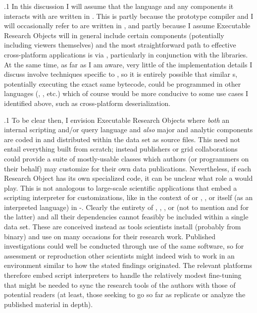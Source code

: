 \documentclass[11pt, twocolumn]{article}
\begin{document}
\p.1{%
In this discussion I will assume that the language and
any components it interacts with are written in .
This is partly because the prototype compiler and
 I will occasionally refer to are written in ,
and partly because I assume Executable Research Objects
will in general include certain  components
(potentially including  viewers themselves) and the
most straightforward path to effective cross-platform
 applications is via , particularly in conjunction
with the  libraries. At the same time, as far as I am
aware, very little of the implementation details
I discuss involve techniques specific to , so it
is entirely possible that similar s, potentially
executing the exact same bytecode, could be programmed
in other languages (, , etc.) \mdash{}
which of course would be more conducive to some use cases
I identified above, such as cross-platform deserialization.
}%

\p.1{%
To be clear then, I envision Executable Research Objects
where \textit{both} an internal scripting and/or query language
and \textit{also} major  and analytic components
are coded in  and distributed within the data set
as source files. This need not entail everything
built from scratch; instead publishers or grid collaborations
could provide a suite of mostly-usable classes which
authors (or programmers on their behalf) may customize
for their own data publications. Nevertheless, if
each Research Object has its own specialized
 code, it can be unclear what role a  would play.
This is not analogous to large-scale scientific
applications that embed a scripting interpreter
for customizations, like  in the context of
 or ,  \visavis{} ,
or  itself (as an interpreted language) in -.
Clearly the entirety of , , ,
or  (not to mention  and  for the latter)
and all their dependencies cannot feasibly be included
within a single data set. These are conceived instead
as tools scientists install (probably from binary)
and use on many occasions for their research work.
Published investigations could well be conducted
through use of the same software, so for assessment
or reproduction other scientists might indeed wish
to work in an environment similar to how the
stated findings originated. The relevant platforms
therefore embed script interpreters to handle
the relatively modest fine-tuning that might be
needed to sync the research tools of the
authors with those of potential readers (at least,
those seeking to go so far as replicate or analyze
the published material in depth).
}%
\end{document}
